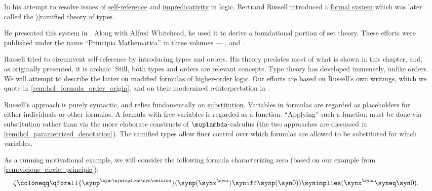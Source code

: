 \begin{definition}\label{def:ramified_theory_of_types}
  In his attempt to resolve issues of \hyperref[ex:self_reference]{self-reference} and \hyperref[con:impredicative_definition]{impredicativity} in logic, Bertrand Russell introduced a \hyperref[con:logical_system]{formal system} which was later called the \term[en=ramified theory of types (\cite[44]{Kleene1971Metamathematics})]{ramified theory of types}.

  He presented this system in \cite{Russell1908TypeTheory}. Along with Alfred Whitehead, he used it to derive a foundational portion of set theory. These efforts were published under the name \enquote{Principia Mathematica} in three volumes --- \cite{WhiteheadRussell1927PrincipiaMathematicaVol1}, \cite{WhiteheadRussell1927PrincipiaMathematicaVol2} and \cite{WhiteheadRussell1927PrincipiaMathematicaVol3}.

  Russell tried to circumvent self-reference by introducing types and orders. His theory predates most of what is shown in this chapter, and, as originally presented, it is archaic. Still, both types and orders are relevant concepts. Type theory has developed immensely, unlike orders. We will attempt to describe the latter on modified \hyperref[def:hol_expression/formula]{formulas of higher-order logic}. Our efforts are based on Russell's own writings, which we quote in \cref{rem:hol_formula_order_origin}, and on their modernized reinterpretation in \cite[\S 2B]{KamareddineLaanNederpelt2005TypeTheory}.

  Russell's approach is purely syntactic, and relies fundamentally on \hyperref[con:syntactic_substitution]{substitution}. Variables in formulas are regarded as placeholders for either individuals or other formulas. A formula with free variables is regarded as a function. \enquote{Applying} such a function must be done via substitution rather than via the more elaborate constructs of \( \muplambda \)-calculus (the two approaches are discussed in \cref{rem:hol_parametrized_denotation}). The ramified types allow finer control over which formulas are allowed to be substituted for which variables.

  As a running motivational example, we will consider the following formula characterizing zero (based on our example from \cref{rem:vicious_circle_principle}):
  \begin{equation*}
    \zeta \coloneqq \qforall {\synp^{\syn\iota \synimplies \syn\omicron}} (\synp(\synx^{\syn\iota}) \syniff \synp(\syn0)) \synimplies (\synx^{\syn\iota} \syneq \syn0).
  \end{equation*}


\end{definition}
